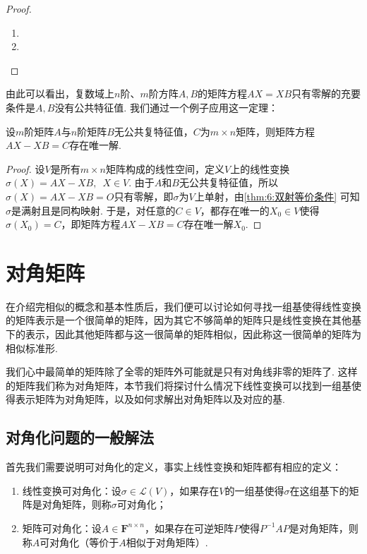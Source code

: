 \begin{proof}
    \begin{enumerate}
        \item

        \item
    \end{enumerate}
\end{proof}

由此可以看出，复数域上$n$阶、$m$阶方阵$A,B$的矩阵方程$AX=XB$只有零解的充要条件是$A,B$没有公共特征值. 我们通过一个例子应用这一定理：
\begin{example}
    设$m$阶矩阵$A$与$n$阶矩阵$B$无公共复特征值，$C$为$m\times n$矩阵，则矩阵方程$AX-XB=C$存在唯一解.
\end{example}

\begin{proof}
    设$V$是所有$m\times n$矩阵构成的线性空间，定义$V$上的线性变换$\sigma(X)=AX-XB,\enspace X\in V$. 由于$A$和$B$无公共复特征值，所以$\sigma(X)=AX-XB=O$只有零解，即$\sigma$为$V$上单射，由\autoref{thm:6:双射等价条件} 可知$\sigma$是满射且是同构映射. 于是，对任意的$C\in V$，都存在唯一的$X_0\in V$使得$\sigma(X_0)=C$，即矩阵方程$AX-XB=C$存在唯一解$X_0$.
\end{proof}

\section{对角矩阵}

在介绍完相似的概念和基本性质后，我们便可以讨论如何寻找一组基使得线性变换的矩阵表示是一个很简单的矩阵，因为其它不够简单的矩阵只是线性变换在其他基下的表示，因此其他矩阵都与这一很简单的矩阵相似，因此称这一很简单的矩阵为相似标准形.

我们心中最简单的矩阵除了全零的矩阵外可能就是只有对角线非零的矩阵了. 这样的矩阵我们称为对角矩阵，本节我们将探讨什么情况下线性变换可以找到一组基使得表示矩阵为对角矩阵，以及如何求解出对角矩阵以及对应的基.

\subsection{对角化问题的一般解法}

首先我们需要说明可对角化的定义，事实上线性变换和矩阵都有相应的定义：
\begin{definition}
    \begin{enumerate}
        \item 线性变换可对角化：设$\sigma\in\mathcal{L}(V)$，如果存在$V$的一组基使得$\sigma$在这组基下的矩阵是对角矩阵，则称$\sigma$可对角化；

        \item 矩阵可对角化：设$A\in\mathbf{F}^{n\times n}$，如果存在可逆矩阵$P$使得$P^{-1}AP$是对角矩阵，则称$A$可对角化（等价于$A$相似于对角矩阵）.
    \end{enumerate}
\end{definition}


